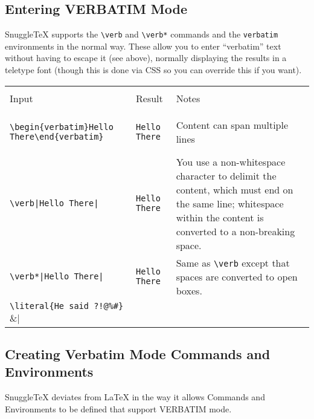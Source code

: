 
\newenvironment{ndemotable}
{\begin{center}
 \begin{tabular}{|l|l|l|}
 \hline \\
 Input & Result & Notes \\
 \hline \\
}{\hline
 \end{tabular}
 \end{center}
}

\subsection*{Entering VERBATIM Mode}

SnuggleTeX supports the \verb|\verb| and \verb|\verb*| commands and the
\texttt{verbatim} environments in the normal way. These allow you to
enter ``verbatim'' text without having to escape it (see above), normally
displaying the results in a teletype font (though this is done via CSS
so you can override this if you want).

\begin{ndemotable}
\verb|\begin{verbatim}Hello There\end{verbatim}| &
\begin{verbatim}Hello There\end{verbatim} &
Content can span multiple lines \\
\hline
\verb!\verb|Hello There|! &
\verb|Hello There| &
You use a non-whitespace character to delimit the content,
which must end on the same line; whitespace within
the content is converted to a non-breaking space. \\
\hline
\verb!\verb*|Hello There|! &
\verb*|Hello There| &
Same as \verb|\verb| except that spaces are converted
to open boxes. \\
\hline
\verb|\literal{He said ?!@%#}| &
\literal{He said ?!@%
This is specific to SnuggleTeX; it lets you enter
text without escaping but displays it as normal. \\
\end{ndemotable}

\subsection*{Creating Verbatim Mode Commands and Environments}

SnuggleTeX deviates from LaTeX in the way it allows Commands
and Environments to be defined that support VERBATIM mode.

